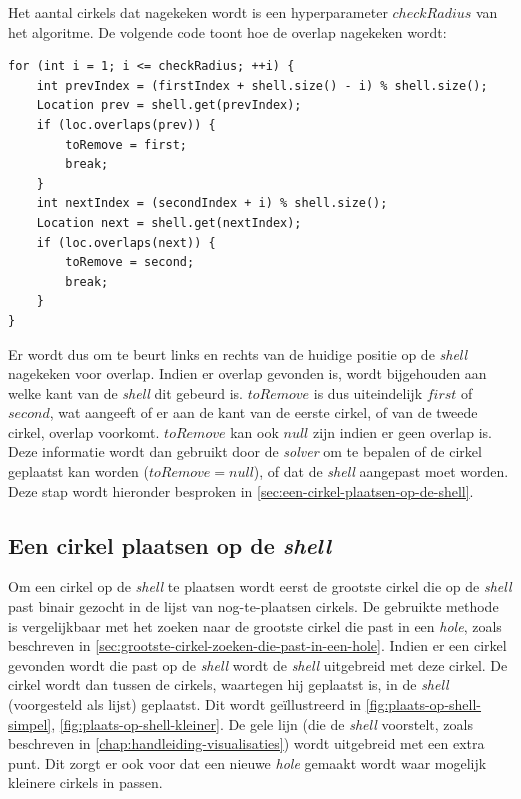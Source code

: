 \documentclass[12pt,a4paper,oneside]{book}
\begin{document}
Het aantal cirkels dat nagekeken wordt is een hyperparameter $checkRadius$ van het algoritme.
De volgende code toont hoe de overlap nagekeken wordt:

\begin{lstlisting}
for (int i = 1; i <= checkRadius; ++i) {
	int prevIndex = (firstIndex + shell.size() - i) % shell.size();
	Location prev = shell.get(prevIndex);
	if (loc.overlaps(prev)) {
		toRemove = first;
		break;
	}
	int nextIndex = (secondIndex + i) % shell.size();
	Location next = shell.get(nextIndex);
	if (loc.overlaps(next)) {
		toRemove = second;
		break;
	}
}
\end{lstlisting}

Er wordt dus om te beurt links en rechts van de huidige positie op de \textit{shell} nagekeken voor overlap.
Indien er overlap gevonden is, wordt bijgehouden aan welke kant van de \textit{shell} dit gebeurd is.
$toRemove$ is dus uiteindelijk $first$ of $second$, wat aangeeft of er aan de kant van de eerste cirkel, of van de tweede cirkel, overlap voorkomt.
$toRemove$ kan ook $null$ zijn indien er geen overlap is.
Deze informatie wordt dan gebruikt door de \textit{solver} om te bepalen of de cirkel geplaatst kan worden ($toRemove = null$), of dat de \textit{shell} aangepast moet worden. Deze stap wordt hieronder besproken in \autoref{sec:een-cirkel-plaatsen-op-de-shell}.

\subsection{Een cirkel plaatsen op de \textit{shell}} \label{sec:een-cirkel-plaatsen-op-de-shell}

Om een cirkel op de \textit{shell} te plaatsen wordt eerst de grootste cirkel die op de \textit{shell} past binair gezocht in de lijst van nog-te-plaatsen cirkels.
De gebruikte methode is vergelijkbaar met het zoeken naar de grootste cirkel die past in een \textit{hole}, zoals beschreven in \autoref{sec:grootste-cirkel-zoeken-die-past-in-een-hole}.
Indien er een cirkel gevonden wordt die past op de \textit{shell} wordt de \textit{shell} uitgebreid met deze cirkel.
De cirkel wordt dan tussen de cirkels, waartegen hij geplaatst is, in de \textit{shell} (voorgesteld als lijst) geplaatst.
Dit wordt geïllustreerd in \autoref{fig:plaats-op-shell-simpel}, \autoref{fig:plaats-op-shell-kleiner}.
De gele lijn (die de \textit{shell} voorstelt, zoals beschreven in \autoref{chap:handleiding-visualisaties}) wordt uitgebreid met een extra punt.
Dit zorgt er ook voor dat een nieuwe \textit{hole} gemaakt wordt waar mogelijk kleinere cirkels in passen.
\end{document}
